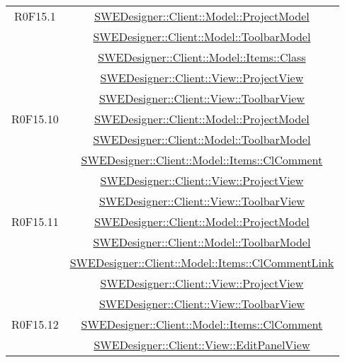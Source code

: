 \documentclass[../DefinizioneDiProdotto.tex]{subfiles}
\begin{document}
\begin{longtable}{|c|c|}
				R0F15.1
				& \hyperlink{SWEDesigner::Client::Model::ProjectModel}{SWEDesigner::Client::Model::ProjectModel}\\
				& \hyperlink{SWEDesigner::Client::Model::ToolbarModel}{SWEDesigner::Client::Model::ToolbarModel}\\
				& \hyperlink{SWEDesigner::Client::Model::Items::Class}{SWEDesigner::Client::Model::Items::Class}\\
				& \hyperlink{SWEDesigner::Client::View::ProjectView}{SWEDesigner::Client::View::ProjectView}\\
				& \hyperlink{SWEDesigner::Client::View::ToolbarView}{SWEDesigner::Client::View::ToolbarView}\\
				\hline

				R0F15.10
				& \hyperlink{SWEDesigner::Client::Model::ProjectModel}{SWEDesigner::Client::Model::ProjectModel}\\
				& \hyperlink{SWEDesigner::Client::Model::ToolbarModel}{SWEDesigner::Client::Model::ToolbarModel}\\
				& \hyperlink{SWEDesigner::Client::Model::Items::ClComment}{SWEDesigner::Client::Model::Items::ClComment}\\
				& \hyperlink{SWEDesigner::Client::View::ProjectView}{SWEDesigner::Client::View::ProjectView}\\
				& \hyperlink{SWEDesigner::Client::View::ToolbarView}{SWEDesigner::Client::View::ToolbarView}\\
				\hline

				R0F15.11
				& \hyperlink{SWEDesigner::Client::Model::ProjectModel}{SWEDesigner::Client::Model::ProjectModel}\\
				& \hyperlink{SWEDesigner::Client::Model::ToolbarModel}{SWEDesigner::Client::Model::ToolbarModel}\\
				& \hyperlink{SWEDesigner::Client::Model::Items::ClCommentLink}{SWEDesigner::Client::Model::Items::ClCommentLink}\\
				& \hyperlink{SWEDesigner::Client::View::ProjectView}{SWEDesigner::Client::View::ProjectView}\\
				& \hyperlink{SWEDesigner::Client::View::ToolbarView}{SWEDesigner::Client::View::ToolbarView}\\
				\hline

				R0F15.12
				& \hyperlink{SWEDesigner::Client::Model::Items::ClComment}{SWEDesigner::Client::Model::Items::ClComment}\\
				& \hyperlink{SWEDesigner::Client::View::EditPanelView}{SWEDesigner::Client::View::EditPanelView}\\
				\hline


\end{longtable}
\end{document}
